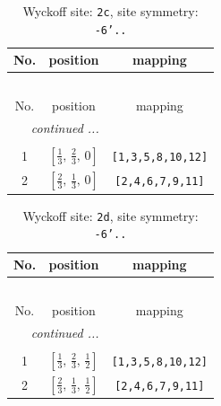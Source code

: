 \documentclass[fleqn,8pt]{jsarticle}
\begin{document}
\begin{longtable}{ccc}
\caption{Wyckoff site: {\tt 2c}, site symmetry: {\tt -6'..}}
 \\
 \hline \hline
No. & position & mapping \\ \hline \endfirsthead

\multicolumn{2}{l}{\tablename\ \thetable{}} \\
 \hline \hline
No. & position & mapping \\ \hline \endhead

 \hline \hline
\multicolumn{2}{r}{\footnotesize\it continued ...} \\ \endfoot

 \hline \hline
\multicolumn{2}{r}{} \\ \endlastfoot

1 & $\left[ \frac{1}{3},\, \frac{2}{3},\, 0 \right]$ & {\tt [1,3,5,8,10,12]} \\ \hline
2 & $\left[ \frac{2}{3},\, \frac{1}{3},\, 0 \right]$ & {\tt [2,4,6,7,9,11]} \\
\end{longtable}
\renewcommand{\arraystretch}{1.2}
\begin{longtable}{ccc}
\caption{Wyckoff site: {\tt 2d}, site symmetry: {\tt -6'..}}
 \\
 \hline \hline
No. & position & mapping \\ \hline \endfirsthead

\multicolumn{2}{l}{\tablename\ \thetable{}} \\
 \hline \hline
No. & position & mapping \\ \hline \endhead

 \hline \hline
\multicolumn{2}{r}{\footnotesize\it continued ...} \\ \endfoot

 \hline \hline
\multicolumn{2}{r}{} \\ \endlastfoot

1 & $\left[ \frac{1}{3},\, \frac{2}{3},\, \frac{1}{2} \right]$ & {\tt [1,3,5,8,10,12]} \\ \hline
2 & $\left[ \frac{2}{3},\, \frac{1}{3},\, \frac{1}{2} \right]$ & {\tt [2,4,6,7,9,11]} \\
\end{longtable}
\renewcommand{\arraystretch}{1.2}
\end{document}
